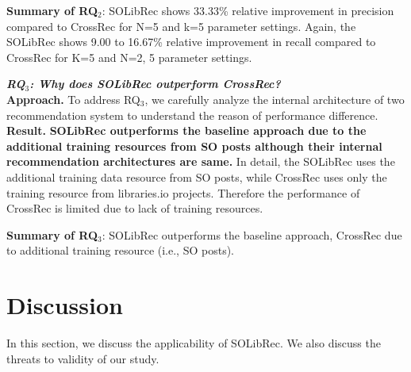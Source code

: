 \documentclass[paper]{ieice}
\newcommand{\RqThree}{\textbf{RQ$_3$: Why does SOLibRec outperform CrossRec?}}
\begin{document}
\begin{tcolorbox}
    \textbf{Summary of RQ$_2$}: 
    SOLibRec shows 33.33\% relative improvement in precision compared to CrossRec for N=5 and k=5 parameter settings. Again, the SOLibRec shows 9.00 to 16.67\% relative improvement in recall compared to CrossRec for K=5 and N=2, 5 parameter settings.
\end{tcolorbox}


\noindent\textit{\RqThree}\\

\noindent\textbf{Approach.} To address RQ$_3$, we carefully analyze the internal architecture of two recommendation system to understand the reason of performance difference. \\

\noindent\textbf{Result.} \textbf{SOLibRec outperforms the baseline approach due to the additional training resources from SO posts although their internal recommendation architectures are same.} In detail, the SOLibRec uses the additional training data resource from SO posts, while CrossRec uses only the training resource from libraries.io projects. Therefore the performance of CrossRec is limited due to lack of training resources.\\

\begin{tcolorbox}
    \textbf{Summary of RQ$_3$}: 
    SOLibRec outperforms the baseline approach, CrossRec due to additional training resource (i.e., SO posts).
\end{tcolorbox}

\section{Discussion}
\label{sec:discussion}
In this section, we discuss the applicability of SOLibRec. We also discuss the threats to validity of our study.\\

\end{document}
